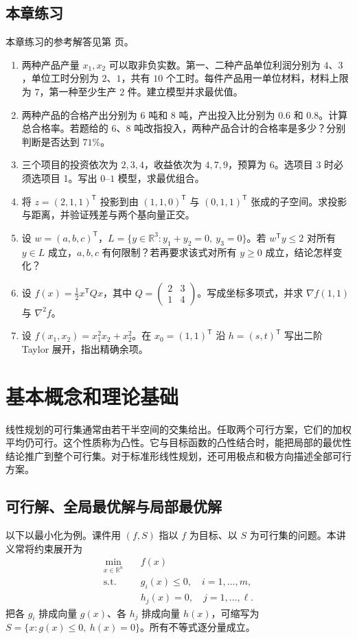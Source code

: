 \documentclass[UTF8,fontset=none,zihao=-4,a4paper]{ctexart}
\newcommand{\chapterpage}[1]{\clearpage\section{#1}}
\newcommand{\R}{\mathbb{R}}
\newcommand{\transpose}{^{\mathsf T}}
\begin{document}
\subsection{本章练习}
本章练习的参考解答见第 \pageref{sec:answers} 页。
\begin{enumerate}[label=1.\arabic*.,ref=1.\arabic*,leftmargin=3em]
\item\label{ex:production} 两种产品产量 $x_1,x_2$ 可以取非负实数。第一、二种产品单位利润分别为 $4$、$3$，单位工时分别为 $2$、$1$，共有 $10$ 个工时。每件产品用一单位材料，材料上限为 $7$，第一种至少生产 $2$ 件。建立模型并求最优值。
\item\label{ex:yield} 两种产品的合格产出分别为 $6$ 吨和 $8$ 吨，产出投入比分别为 $0.6$ 和 $0.8$。计算总合格率。若题给的 $6$、$8$ 吨改指投入，两种产品合计的合格率是多少？分别判断是否达到 $71\%$。
\item\label{ex:choose} 三个项目的投资依次为 $2,3,4$，收益依次为 $4,7,9$，预算为 $6$。选项目 3 时必须选项目 1。写出 $0$--$1$ 模型，求最优组合。
\item\label{ex:proj} 将 $z=(2,1,1)\transpose$ 投影到由 $(1,1,0)\transpose$ 与 $(0,1,1)\transpose$ 张成的子空间。求投影与距离，并验证残差与两个基向量正交。
\item\label{ex:orth} 设 $w=(a,b,c)\transpose$，$L=\{y\in\R^3:y_1+y_2=0,\ y_3=0\}$。若 $w\transpose y\le2$ 对所有 $y\in L$ 成立，$a,b,c$ 有何限制？若再要求该式对所有 $y\ge0$ 成立，结论怎样变化？
\item\label{ex:quadratic} 设 $f(x)=\tfrac12x\transpose Qx$，其中 $Q=\begin{pmatrix}2&3\\1&4\end{pmatrix}$。写成坐标多项式，并求 $\nabla f(1,1)$ 与 $\nabla^2f$。
\item\label{ex:taylor} 设 $f(x_1,x_2)=x_1^2x_2+x_2^2$。在 $x_0=(1,1)\transpose$ 沿 $h=(s,t)\transpose$ 写出二阶 Taylor 展开，指出精确余项。
\end{enumerate}

\chapterpage{基本概念和理论基础}\label{sec:theory}
线性规划的可行集通常由若干半空间的交集给出。任取两个可行方案，它们的加权平均仍可行。这个性质称为凸性。它与目标函数的凸性结合时，能把局部的最优性结论推广到整个可行集。对于标准形线性规划，还可用极点和极方向描述全部可行方案。

\subsection{可行解、全局最优解与局部最优解}
以下以最小化为例。课件用 $(f,S)$ 指以 $f$ 为目标、以 $S$ 为可行集的问题。本讲义常将约束展开为
\[
\begin{aligned}
\min_{x\in\R^n}\quad & f(x)\\
\text{s.t.}\quad & g_i(x)\le0,\quad i=1,\ldots,m,\\
& h_j(x)=0,\quad j=1,\ldots,\ell .
\end{aligned}
\]
把各 $g_i$ 排成向量 $g(x)$、各 $h_j$ 排成向量 $h(x)$，可缩写为 $S=\{x:g(x)\le0,\ h(x)=0\}$。所有不等式逐分量成立。
\end{document}
